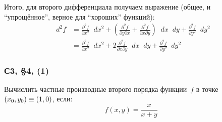 \documentclass[a4paper,12pt]{article}
\newcommand{\diff}{\mathop{}\!d}
\begin{document}
  Итого, для второго дифференциала получаем выражение (общее, и ``упрощённое'', верное для ``хороших'' функций):
  \begin{equation}\label{eq:diff2-in-Rn}
  \begin{split}
    \diff^2 f
    &= \frac{\partial^2 f}{\partial x^2} \diff x^2
    + \left(\frac{\partial^2 f}{\partial y \partial x} + \frac{\partial^2 f}{\partial x \partial y}\right) \diff x \diff y + \frac{\partial^2 f}{\partial y^2} \diff y^2\\
    &= \frac{\partial^2 f}{\partial x^2} \diff x^2
    + 2\frac{\partial^2 f}{\partial x \partial y} \diff x \diff y + \frac{\partial^2 f}{\partial y^2} \diff y^2
  \end{split}
  \end{equation}
  

  \subsubsection{С3, \S 4, (1)}

  Вычислить частные производные второго порядка функции~$f$ в точке~$(x_0, y_0) \hm\equiv (1, 0)$, если:
  \[
    f(x, y) = \frac{x}{x + y}
  \]
  
\end{document}
